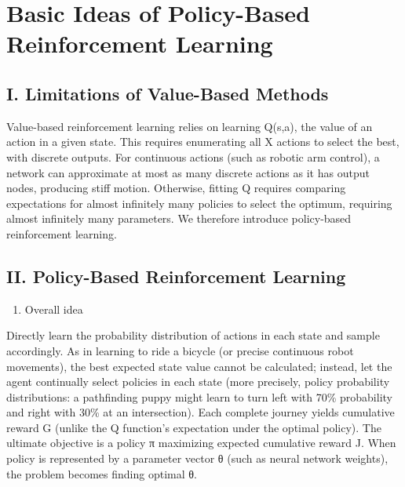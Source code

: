 \setcounter{section}{0}

\hypertarget{basic-ideas-of-policy-based-reinforcement-learning}{%
\section{Basic Ideas of Policy-Based Reinforcement Learning}\label{basic-ideas-of-policy-based-reinforcement-learning}}

\hypertarget{i.-limitations-of-value-based-methods}{%
\subsection{I. Limitations of Value-Based Methods}\label{i.-limitations-of-value-based-methods}}

Value-based reinforcement learning relies on learning Q(s,a), the value of an action in a given state. This requires enumerating all X actions to select the best, with discrete outputs. For continuous actions (such as robotic arm control), a network can approximate at most as many discrete actions as it has output nodes, producing stiff motion. Otherwise, fitting Q requires comparing expectations for almost infinitely many policies to select the optimum, requiring almost infinitely many parameters. We therefore introduce policy-based reinforcement learning.

\hypertarget{ii.-policy-based-reinforcement-learning}{%
\subsection{II. Policy-Based Reinforcement Learning}\label{ii.-policy-based-reinforcement-learning}}

\begin{enumerate}
\def\labelenumi{\arabic{enumi}.}
\tightlist
\item
  Overall idea
\end{enumerate}

Directly learn the probability distribution of actions in each state and sample accordingly. As in learning to ride a bicycle (or precise continuous robot movements), the best expected state value cannot be calculated; instead, let the agent continually select policies in each state (more precisely, policy probability distributions: a pathfinding puppy might learn to turn left with 70\% probability and right with 30\% at an intersection). Each complete journey yields cumulative reward G (unlike the Q function's expectation under the optimal policy). The ultimate objective is a policy π maximizing expected cumulative reward J. When policy is represented by a parameter vector θ (such as neural network weights), the problem becomes finding optimal θ.

